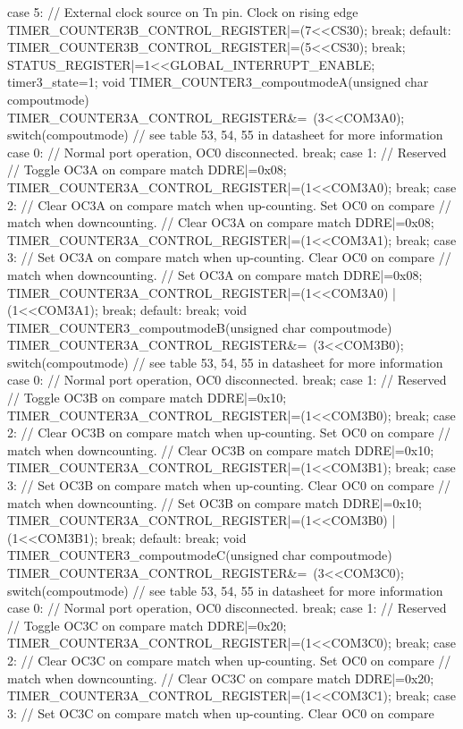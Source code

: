 \begin{verbatimtab}
{{{			case 5: // External clock source on Tn pin. Clock on rising edge
			TIMER_COUNTER3B_CONTROL_REGISTER|=(7<<CS30);
			break;
			default:
			TIMER_COUNTER3B_CONTROL_REGISTER|=(5<<CS30);
			break;
		}
		STATUS_REGISTER|=1<<GLOBAL_INTERRUPT_ENABLE;
		timer3_state=1;
	}	
}
void TIMER_COUNTER3_compoutmodeA(unsigned char compoutmode)
{
	TIMER_COUNTER3A_CONTROL_REGISTER&=~(3<<COM3A0);
	switch(compoutmode){ // see table 53, 54, 55 in datasheet for more information
		case 0: // Normal port operation, OC0 disconnected.
		break;
		case 1: // Reserved
		// Toggle OC3A on compare match
		DDRE|=0x08;
		TIMER_COUNTER3A_CONTROL_REGISTER|=(1<<COM3A0);
		break;
		case 2: // Clear OC3A on compare match when up-counting. Set OC0 on compare
		// match when downcounting.
		// Clear OC3A on compare match
		DDRE|=0x08;
		TIMER_COUNTER3A_CONTROL_REGISTER|=(1<<COM3A1);
		break;
		case 3: // Set OC3A on compare match when up-counting. Clear OC0 on compare
		// match when downcounting.
		// Set OC3A on compare match
		DDRE|=0x08;
		TIMER_COUNTER3A_CONTROL_REGISTER|=(1<<COM3A0) | (1<<COM3A1);
		break;
		default:
		break;
	}
}
void TIMER_COUNTER3_compoutmodeB(unsigned char compoutmode)
{
	TIMER_COUNTER3A_CONTROL_REGISTER&=~(3<<COM3B0);
	switch(compoutmode){ // see table 53, 54, 55 in datasheet for more information
		case 0: // Normal port operation, OC0 disconnected.
		break;
		case 1: // Reserved
		// Toggle OC3B on compare match
		DDRE|=0x10;
		TIMER_COUNTER3A_CONTROL_REGISTER|=(1<<COM3B0);
		break;
		case 2: // Clear OC3B on compare match when up-counting. Set OC0 on compare
		// match when downcounting.
		// Clear OC3B on compare match
		DDRE|=0x10;
		TIMER_COUNTER3A_CONTROL_REGISTER|=(1<<COM3B1);
		break;
		case 3: // Set OC3B on compare match when up-counting. Clear OC0 on compare
		// match when downcounting.
		// Set OC3B on compare match
		DDRE|=0x10;
		TIMER_COUNTER3A_CONTROL_REGISTER|=(1<<COM3B0) | (1<<COM3B1);
		break;
		default:
		break;
	}
}
void TIMER_COUNTER3_compoutmodeC(unsigned char compoutmode)
{
	TIMER_COUNTER3A_CONTROL_REGISTER&=~(3<<COM3C0);
	switch(compoutmode){ // see table 53, 54, 55 in datasheet for more information
		case 0: // Normal port operation, OC0 disconnected.
		break;
		case 1: // Reserved
		// Toggle OC3C on compare match
		DDRE|=0x20;
		TIMER_COUNTER3A_CONTROL_REGISTER|=(1<<COM3C0);
		break;
		case 2: // Clear OC3C on compare match when up-counting. Set OC0 on compare
		// match when downcounting.
		// Clear OC3C on compare match
		DDRE|=0x20;
		TIMER_COUNTER3A_CONTROL_REGISTER|=(1<<COM3C1);
		break;
		case 3: // Set OC3C on compare match when up-counting. Clear OC0 on compare
}}
\end{verbatimtab}
